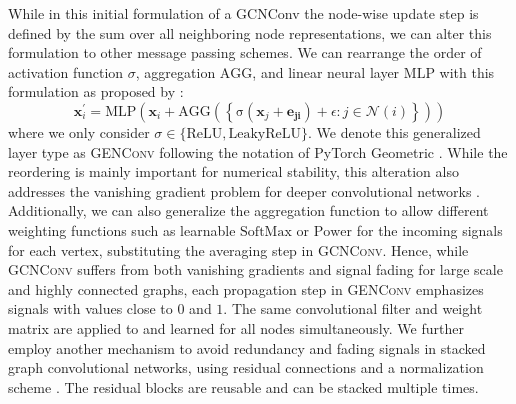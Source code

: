 \documentclass{bioinfo}
\renewcommand{\cite}{\citep}
\begin{document}
While in this initial formulation of a GCNConv the node-wise update
step is defined by the sum over all neighboring node representations,
we can alter this formulation to other message passing schemes.  We
can rearrange the order of activation function $\sigma$, aggregation
$\mathrm{AGG}$, and linear neural layer $\mathrm{MLP}$ with this
formulation as proposed by \citet{GENConv2020}:
\begin{equation}
	\mathbf{x}_i^{\prime} = \mathrm{MLP} \left( \mathbf{x}_i +
	\mathrm{AGG} \left( \left\{
	\mathrm{\sigma} \left( \mathbf{x}_j + \mathbf{e_{ji}} \right) +\epsilon
	: j \in \mathcal{N}(i) \right\} \right)
	\right)
\end{equation}
where we only consider
$\sigma \in \{\mathrm{ReLU}, \mathrm{LeakyReLU}\}$. We denote this
generalized layer type as \textsc{GENConv} following the notation of
PyTorch Geometric \cite{PytorchGeometric}.  While the reordering is
mainly important for numerical stability, this alteration also addresses
the vanishing gradient problem for deeper convolutional networks
\cite{GENConv2020}. Additionally, we can also generalize the
aggregation function to allow different weighting functions such as
learnable $\mathrm{SoftMax}$ or $\mathrm{Power}$ for the incoming
signals for each vertex, substituting the averaging step in
\textsc{GCNConv}. Hence, while \textsc{GCNConv} suffers from both
vanishing gradients and signal fading for large scale and highly
connected graphs, each propagation step in \textsc{GENConv} emphasizes
signals with values close to $0$ and $1$. The same convolutional
filter and weight matrix are applied to and learned for all nodes
simultaneously. %
We further employ another mechanism to avoid redundancy and fading
signals in stacked graph convolutional networks, using residual
connections and a normalization scheme \cite{DeepGCN2019,
  DeeperGCN2020}.  The residual blocks are reusable and can be stacked
multiple times. %

\end{document}

